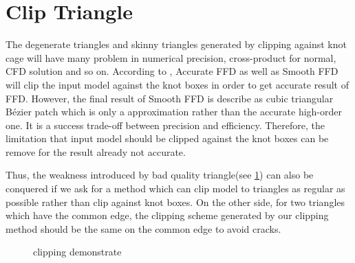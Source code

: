 \documentclass[3p]{elsarticle}
\begin{document}
\section{Clip Triangle}
The degenerate triangles and skinny triangles generated by clipping against knot cage will have many problem in numerical precision, cross-product for normal, CFD solution and so on.
According to \cite{Feng98, Feng00}, Accurate FFD as well as Smooth FFD will clip the input model against the knot boxes in order to get accurate result of FFD. However, the final result of Smooth FFD is describe as cubic triangular Bézier patch which is only a approximation rather than the accurate high-order one. It is a success trade-off between precision and efficiency. Therefore, the limitation that input model should be clipped against the knot boxes can be remove for the result already not accurate.

Thus, the weakness introduced by bad quality triangle(see \ref{fig:clip_quality}) can also be conquered if we ask for a method which can clip model to triangles as regular as possible rather than clip against knot boxes. On the other side, for two triangles which have the common edge, the clipping scheme generated by our clipping method should be the same on the common edge to avoid cracks.

\begin{figure}
  \centering
  \hfill
  \hfill
  \caption{clipping demonstrate}
  \label{fig:clip_quality}
\end{figure}
\end{document}
